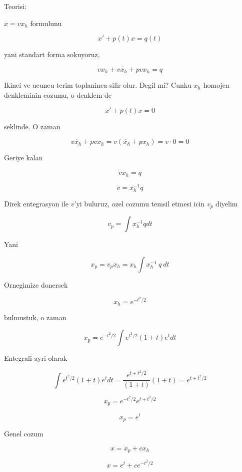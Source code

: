 \documentclass[12pt,fleqn]{article}
\begin{document}
Teorisi:

$x=vx_h$ formulunu 

\[ x' + p(t)x = q(t) \]
 
yani standart forma sokuyoruz, 

\[ \dot{v}x_h + v\dot{x_h} + pvx_h = q \]

Ikinci ve ucuncu terim toplaninca sifir olur. Degil mi? Cunku $x_h$ homojen
denkleminin cozumu, o denklem de

\[ x' + p(t)x = 0 \]
 
seklinde. O zaman

\[ v\dot{x_h} + pvx_h = v(\dot{x_h} + px_h) = v \cdot 0 = 0 \]

Geriye kalan 

\[ \dot{v}x_h  = q \]

\[ \dot{v} = x_h^{-1} q \]

Direk entegrasyon ile $v$'yi buluruz, ozel cozumu temsil etmesi icin $v_p$
diyelim

\[ v_p = \int x_h^{-1} q dt\]

Yani 

\[ x_p = v_p x_h = x_h \int x_h^{-1} \ q \ dt \]

Ornegimize donersek

\[ x_h = e^{-t^2/2} \]
 
bulmustuk, o zaman 

\[ x_p =  e^{-t^2/2} \int e^{t^2/2} (1+t)e^t dt\]

Entegrali ayri olarak

\[ \int e^{t^2/2} (1+t)e^t dt  = 
\frac{e^{t+ t^2/2}}{(1+t)}{(1+t)} = 
e^{t+ t^2/2}
\]

\[ x_p =  e^{-t^2/2} e^{t+ t^2/2} \]

\[ x_p = e^t \]

Genel cozum 

\[ x = x_p + cx_h \]

\[ x = e^t + ce^{-t^2/2}  \]
\end{document}
